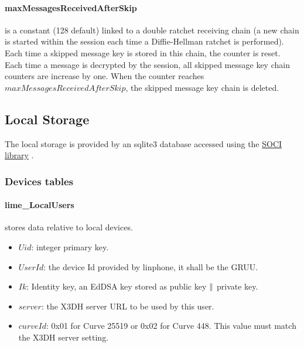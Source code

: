 \documentclass[a4paper,11pt]{article}
\begin{document}
      \paragraph{maxMessagesReceivedAfterSkip} is a constant (128 default) linked to a double ratchet receiving chain (a new chain is started within the session each time a Diffie-Hellman ratchet is performed). Each time a skipped message key is stored in this chain, the counter is reset. Each time a message is decrypted by the session, all skipped message key chain counters are increase by one. When the counter reaches $maxMessagesReceivedAfterSkip$, the skipped message key chain is deleted.
    

  \subsection{Local Storage}
    The local storage is provided by an sqlite3 database accessed using the \href{https://github.com/SOCI/soci}{SOCI library} \cite{libsoci}.
    \subsubsection{Devices tables}
    \paragraph*{lime\_LocalUsers} stores data relative to local devices.
    \begin{itemize}
      \item $Uid$: integer primary key.
      \item $UserId$: the device Id provided by linphone, it shall be the GRUU.
      \item $Ik$: Identity key, an EdDSA key stored as public key $\Arrowvert $ private key.
      \item $server$: the X3DH server URL to be used by this user.
      \item $curveId$: 0x01 for Curve 25519 or 0x02 for Curve 448. This value must match the X3DH server setting.
    \end{itemize}
    
\end{document}
